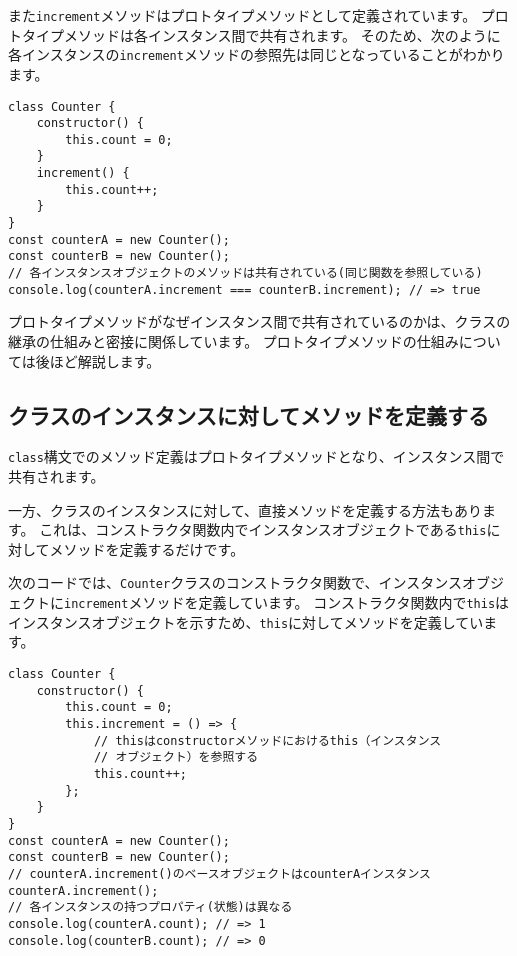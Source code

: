 また\texttt{increment}メソッドはプロトタイプメソッドとして定義されています。
プロトタイプメソッドは各インスタンス間で共有されます。
そのため、次のように各インスタンスの\texttt{increment}メソッドの参照先は同じとなっていることがわかります。

\begin{lstlisting}
class Counter {
    constructor() {
        this.count = 0;
    }
    increment() {
        this.count++;
    }
}
const counterA = new Counter();
const counterB = new Counter();
// 各インスタンスオブジェクトのメソッドは共有されている(同じ関数を参照している)
console.log(counterA.increment === counterB.increment); // => true
\end{lstlisting}

プロトタイプメソッドがなぜインスタンス間で共有されているのかは、クラスの継承の仕組みと密接に関係しています。
プロトタイプメソッドの仕組みについては後ほど解説します。

\hypertarget{class-instance-method}{%
\subsection{クラスのインスタンスに対してメソッドを定義する}\label{class-instance-method}}

\texttt{class}構文でのメソッド定義はプロトタイプメソッドとなり、インスタンス間で共有されます。

一方、クラスのインスタンスに対して、直接メソッドを定義する方法もあります。
これは、コンストラクタ関数内でインスタンスオブジェクトである\texttt{this}に対してメソッドを定義するだけです。

次のコードでは、\texttt{Counter}クラスのコンストラクタ関数で、インスタンスオブジェクトに\texttt{increment}メソッドを定義しています。
コンストラクタ関数内で\texttt{this}はインスタンスオブジェクトを示すため、\texttt{this}に対してメソッドを定義しています。

\begin{lstlisting}
class Counter {
    constructor() {
        this.count = 0;
        this.increment = () => {
            // thisはconstructorメソッドにおけるthis（インスタンス
            // オブジェクト）を参照する
            this.count++;
        };
    }
}
const counterA = new Counter();
const counterB = new Counter();
// counterA.increment()のベースオブジェクトはcounterAインスタンス
counterA.increment();
// 各インスタンスの持つプロパティ(状態)は異なる
console.log(counterA.count); // => 1
console.log(counterB.count); // => 0
\end{lstlisting}

